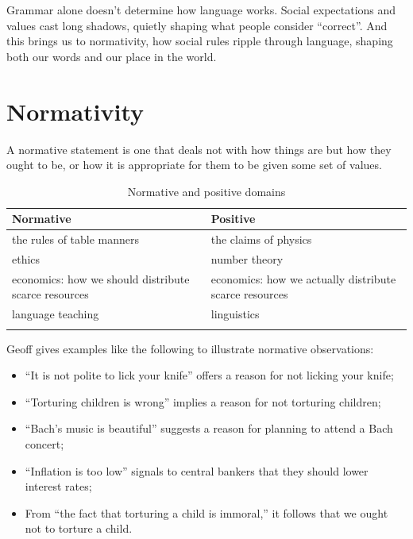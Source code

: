 Grammar alone doesn't determine how language works. Social expectations and values cast long shadows, quietly shaping what people consider \enquote{correct}. And this brings us to normativity, how social rules ripple through language, shaping both our words and our place in the world.

\section{Normativity}\label{sec:normativity}

A normative statement is one that deals not with how things are but how they ought to be, or how it is appropriate for them to be given some set of values.

\begin{table}
        \begin{tabularx}{\textwidth}{XX}
            \lsptoprule
            Normative & Positive \\
            \midrule
            the rules of table manners & the claims of physics \\
            ethics & number theory \\
            economics: how we should distribute scarce resources & economics: how we actually distribute scarce resources \\
            language teaching & linguistics \\
            \lspbottomrule
        \end{tabularx}
    \caption{Normative and positive domains}
\end{table}

Geoff \textcite[205]{Pullum2019} gives examples like the following to illustrate normative observations:
\begin{itemize}[noitemsep]
    \item \enquote{It is not polite to lick your knife} offers a reason for not licking your knife;
    \item \enquote{Torturing children is wrong} implies a reason for not torturing children;
    \item \enquote{Bach's music is beautiful} suggests a reason for planning to attend a Bach concert;
    \item \enquote{Inflation is too low} signals to central bankers that they should lower interest rates;
    \item From \enquote{the fact that torturing a child is immoral,} it follows that we ought not to torture a child.
\end{itemize}

